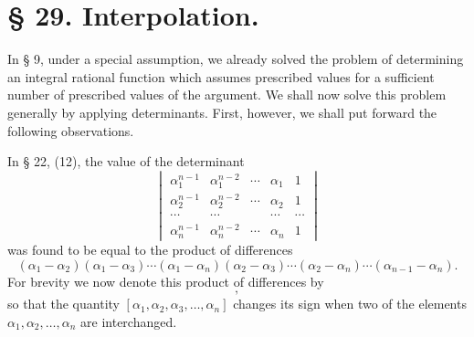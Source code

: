 \documentclass[11pt]{article}
\begin{document}
\section*{§ 29. Interpolation.}

In § 9, under a special assumption, we already solved the problem of determining an integral rational function which assumes prescribed values for a sufficient number of prescribed values of the argument. We shall now solve this problem generally by applying determinants. First, however, we shall put forward the following observations.

In § 22, (12), the value of the determinant
\[
\begin{vmatrix}
 \alpha_1^{n-1}&\alpha_1^{n-2}&\cdots&\alpha_1&1\\
 \alpha_2^{n-1}&\alpha_2^{n-2}&\cdots&\alpha_2&1\\
 \cdots&\cdots&&\cdots&\cdots\\
 \alpha_n^{n-1}&\alpha_n^{n-2}&\cdots&\alpha_n&1
\end{vmatrix}
\]
was found to be equal to the product of differences
\begin{equation}
(\alpha_1-\alpha_2)(\alpha_1-\alpha_3)\cdots(\alpha_1-\alpha_n)
(\alpha_2-\alpha_3)\cdots(\alpha_2-\alpha_n)\cdots(\alpha_{n-1}-\alpha_n).\tag{1}
\end{equation}
For brevity we now denote this product of differences by
\begin{equation}
 [\alpha_1,\alpha_2,\alpha_3,\ldots,\alpha_n],\tag{2}
\end{equation}
so that the quantity $[\alpha_1,\alpha_2,\alpha_3,\ldots,\alpha_n]$ changes its sign when two of the elements $\alpha_1,\alpha_2,
\ldots,\alpha_n$ are interchanged.
\end{document}
